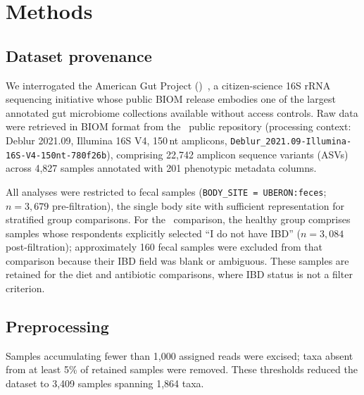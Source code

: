 \section{Methods}
\label{sec:methods}

\subsection{Dataset provenance}
\label{subsec:dataset}

We interrogated the American Gut Project (\agp)~\citep{mcdonald2018american},
a citizen-science 16S rRNA sequencing initiative whose public BIOM release
embodies one of the largest annotated gut microbiome collections available
without access controls.
Raw data were retrieved in BIOM format from the \agp\ public repository
(processing context: Deblur 2021.09, Illumina 16S V4, 150\,nt amplicons,
\texttt{Deblur\_2021.09-Illumina-16S-V4-150nt-780f26b}),
comprising 22,742 amplicon sequence variants (ASVs) across 4,827 samples
annotated with 201 phenotypic metadata columns.

All analyses were restricted to fecal samples (\texttt{BODY\_SITE =
UBERON:feces}; $n = 3{,}679$ pre-filtration), the single body site with
sufficient representation for stratified group comparisons.
For the \ibd\ comparison, the healthy group comprises samples whose
respondents explicitly selected ``I do not have IBD'' ($n = 3{,}084$
post-filtration); approximately 160 fecal samples were excluded from
that comparison because their IBD field was blank or ambiguous.
These samples are retained for the diet and antibiotic comparisons,
where IBD status is not a filter criterion.

\subsection{Preprocessing}
\label{subsec:preprocessing}

Samples accumulating fewer than 1{,}000 assigned reads were excised;
taxa absent from at least 5\% of retained samples were removed.
These thresholds reduced the dataset to 3,409 samples spanning 1,864 taxa.

